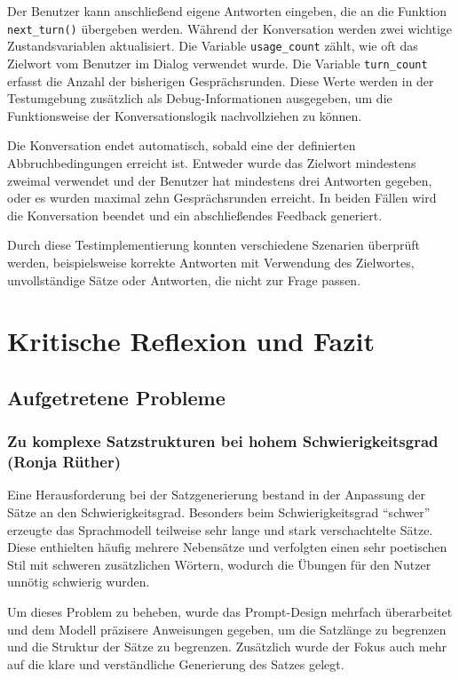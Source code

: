 Der Benutzer kann anschließend eigene Antworten eingeben, die an die Funktion \texttt{next\_turn()} übergeben werden. 
Während der Konversation werden zwei wichtige Zustandsvariablen aktualisiert. 
Die Variable \texttt{usage\_count} zählt, wie oft das Zielwort vom Benutzer im Dialog verwendet wurde. 
Die Variable \texttt{turn\_count} erfasst die Anzahl der bisherigen Gesprächsrunden. 
Diese Werte werden in der Testumgebung zusätzlich als Debug-Informationen ausgegeben, um die Funktionsweise der Konversationslogik nachvollziehen zu können.

Die Konversation endet automatisch, sobald eine der definierten Abbruchbedingungen erreicht ist. 
Entweder wurde das Zielwort mindestens zweimal verwendet und der Benutzer hat mindestens drei Antworten gegeben, oder es wurden maximal zehn Gesprächsrunden erreicht. 
In beiden Fällen wird die Konversation beendet und ein abschließendes Feedback generiert.

Durch diese Testimplementierung konnten verschiedene Szenarien überprüft werden, beispielsweise korrekte Antworten mit Verwendung des Zielwortes, unvollständige Sätze oder Antworten, die nicht zur Frage passen. 

\section{Kritische Reflexion und Fazit}
\subsection{Aufgetretene Probleme}
\subsubsection{Zu komplexe Satzstrukturen bei hohem Schwierigkeitsgrad (Ronja Rüther)}
Eine Herausforderung bei der Satzgenerierung bestand in der Anpassung der Sätze an den Schwierigkeitsgrad. 
Besonders beim Schwierigkeitsgrad \enquote{schwer} erzeugte das Sprachmodell teilweise sehr lange und stark verschachtelte Sätze.
Diese enthielten häufig mehrere Nebensätze und verfolgten einen sehr poetischen Stil mit schweren zusätzlichen Wörtern, wodurch die Übungen für den Nutzer unnötig schwierig wurden.

Um dieses Problem zu beheben, wurde das Prompt-Design mehrfach überarbeitet und dem Modell präzisere Anweisungen gegeben, um die Satzlänge zu begrenzen und die Struktur der Sätze zu begrenzen.
Zusätzlich wurde der Fokus auch mehr auf die klare und verständliche Generierung des Satzes gelegt.

